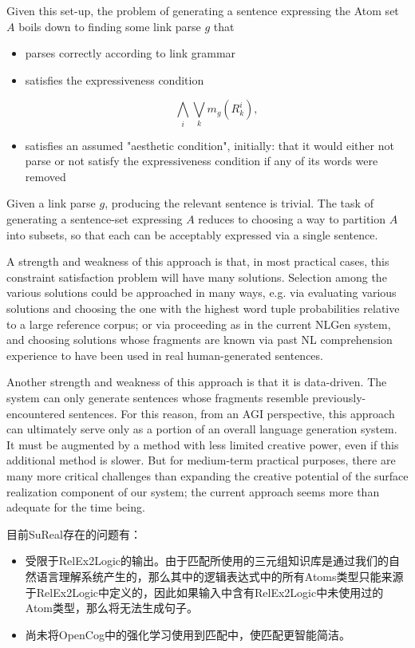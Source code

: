 Given this set-up, the problem of generating a sentence expressing the Atom set $A$ boils down to finding some link parse $g$ that 

\begin{itemize}
\item parses correctly according to link grammar
\item satisfies the expressiveness condition

$$
\bigwedge_i \bigvee_k m_g(R^i_k),
$$

\item satisfies an assumed "aesthetic condition", initially: that it would either not parse or not satisfy the expressiveness condition if any of its words were removed
\end{itemize}

\noindent Given a link parse $g$, producing the relevant sentence is trivial.  The task of generating a sentence-set expressing $A$ reduces to choosing a way to partition $A$ into subsets, so that each can be acceptably expressed via a single sentence.  

A strength and weakness of this approach is that, in most practical cases, this constraint satisfaction problem will have many solutions.  Selection among the various solutions could be approached in many ways, e.g.  via evaluating various solutions and choosing the one with the highest  word tuple probabilities relative to a large reference corpus; or via proceeding as in the current NLGen system, and choosing solutions whose fragments are known via past NL comprehension experience to have been used in real human-generated sentences.

Another strength and  weakness of this approach is that it is data-driven.   The system can only generate sentences whose fragments resemble previously-encountered sentences.  For this reason, from an AGI perspective, this approach can ultimately serve only as a portion of an overall language generation system.  It must be augmented by a method with less limited creative power, even if this additional method is slower.  But for medium-term practical purposes, there are many more critical challenges than expanding the creative potential of the surface realization component of our system; the current approach seems more than adequate for the time being.


目前SuReal存在的问题有：

\begin{itemize}
\item 受限于RelEx2Logic的输出。由于匹配所使用的三元组知识库是通过我们的自然语言理解系统产生的，那么其中的逻辑表达式中的所有Atoms类型只能来源于RelEx2Logic中定义的，因此如果输入中含有RelEx2Logic中未使用过的Atom类型，那么将无法生成句子。
\item 尚未将OpenCog中的强化学习使用到匹配中，使匹配更智能简洁。
\end{itemize}

